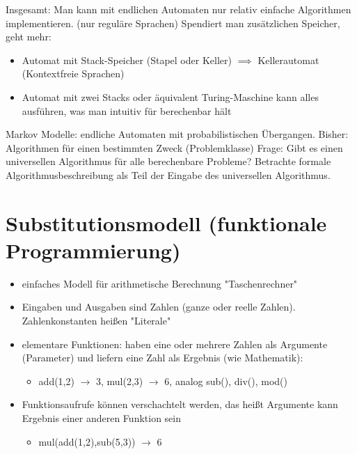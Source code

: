 \documentclass[a4paper]{scrartcl}
\theoremstyle{definition}
\theoremstyle{plain}
\theoremstyle{remark}
\theoremstyle{remark}
\begin{document}
Insgesamt: Man kann mit endlichen Automaten nur relativ einfache Algorithmen implementieren. (nur reguläre Sprachen)
Spendiert man zusätzlichen Speicher, geht mehr:
\begin{itemize}
\item Automat mit Stack-Speicher (Stapel oder Keller) $\implies$ Kellerautomat (Kontextfreie Sprachen)
\item Automat mit zwei Stacks oder äquivalent Turing-Maschine kann alles ausführen, was man intuitiv für berechenbar hält
\end{itemize}
Markov Modelle: endliche Automaten mit probabilistischen Übergangen.
Bisher: Algorithmen für einen bestimmten Zweck (Problemklasse)
Frage: Gibt es einen universellen Algorithmus für alle berechenbare Probleme?
Betrachte formale Algorithmusbeschreibung als Teil der Eingabe des universellen Algorithmus.
\section{Substitutionsmodell (funktionale Programmierung)}
\label{sec-4}
\begin{itemize}
\item einfaches Modell für arithmetische Berechnung "Taschenrechner"
\item Eingaben und Ausgaben sind Zahlen (ganze oder reelle Zahlen). Zahlenkonstanten heißen "Literale"
\item elementare Funktionen: haben eine oder mehrere Zahlen als Argumente (Parameter) und liefern eine Zahl als Ergebnis (wie Mathematik):
\begin{itemize}
\item add(1,2) $\rightarrow$ 3, mul(2,3) $\rightarrow$ 6, analog sub(), div(), mod()
\end{itemize}
\item Funktionsaufrufe können verschachtelt werden, das heißt Argumente kann Ergebnis einer anderen Funktion sein
\begin{itemize}
\item mul(add(1,2),sub(5,3)) $\rightarrow$ 6
\end{itemize}
\end{itemize}
\end{document}
